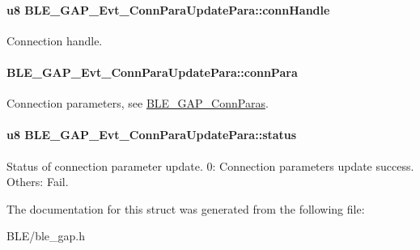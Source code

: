 \paragraph[{\texorpdfstring{conn\+Handle}{connHandle}}]{\setlength{\rightskip}{0pt plus 5cm}u8 B\+L\+E\+\_\+\+G\+A\+P\+\_\+\+Evt\+\_\+\+Conn\+Para\+Update\+Para\+::conn\+Handle}\hypertarget{struct_b_l_e___g_a_p___evt___conn_para_update_para_ad3469de7c01d25816e74d777604df53b}{}\label{struct_b_l_e___g_a_p___evt___conn_para_update_para_ad3469de7c01d25816e74d777604df53b}
Connection handle. 
\paragraph[{\texorpdfstring{conn\+Para}{connPara}}]{ B\+L\+E\+\_\+\+G\+A\+P\+\_\+\+Evt\+\_\+\+Conn\+Para\+Update\+Para\+::conn\+Para}\hypertarget{struct_b_l_e___g_a_p___evt___conn_para_update_para_ab5461df706020b9bdfeadb0080a0c99d}{}\label{struct_b_l_e___g_a_p___evt___conn_para_update_para_ab5461df706020b9bdfeadb0080a0c99d}
Connection parameters, see \hyperlink{struct_b_l_e___g_a_p___conn_paras}{B\+L\+E\+\_\+\+G\+A\+P\+\_\+\+Conn\+Paras}. 
\paragraph[{\texorpdfstring{status}{status}}]{\setlength{\rightskip}{0pt plus 5cm}u8 B\+L\+E\+\_\+\+G\+A\+P\+\_\+\+Evt\+\_\+\+Conn\+Para\+Update\+Para\+::status}\hypertarget{struct_b_l_e___g_a_p___evt___conn_para_update_para_a369624cc4dad2e7c5a433633fe688f32}{}\label{struct_b_l_e___g_a_p___evt___conn_para_update_para_a369624cc4dad2e7c5a433633fe688f32}
Status of connection parameter update. 0\+: Connection parameters update success. Others\+: Fail. 

The documentation for this struct was generated from the following file\+:\begin{DoxyCompactItemize}
\item 
B\+L\+E/ble\+\_\+gap.\+h\end{DoxyCompactItemize}
